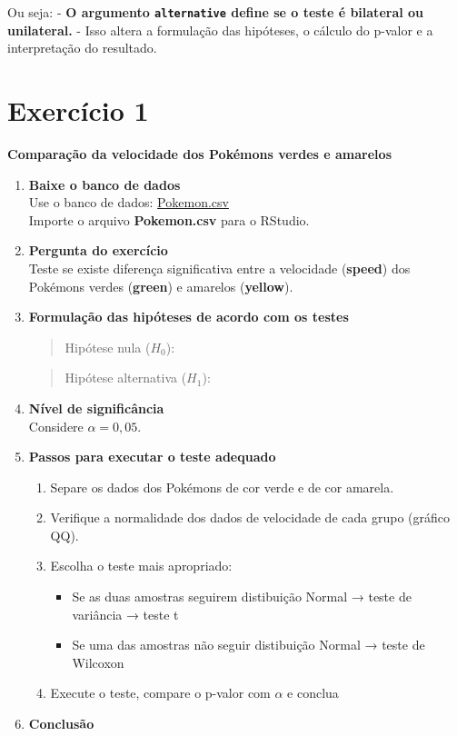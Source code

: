 \documentclass[
]{book}
\providecommand{\tightlist}{%
  \setlength{\itemsep}{0pt}\setlength{\parskip}{0pt}}
\begin{document}
Ou seja:
- \textbf{O argumento \texttt{alternative} define se o teste é bilateral ou unilateral.}
- Isso altera a formulação das hipóteses, o cálculo do p-valor e a interpretação do resultado.

\section{Exercício 1}\label{exercuxedcio-1}

\textbf{Comparação da velocidade dos Pokémons verdes e amarelos}

\begin{enumerate}
\def\labelenumi{\arabic{enumi}.}
\item
  \textbf{Baixe o banco de dados}\\
  Use o banco de dados: \href{https://drive.google.com/drive/folders/1gyORbBEuKBstfSKULA58TLhawOXaY-st}{Pokemon.csv}\\
  Importe o arquivo \textbf{Pokemon.csv} para o RStudio.
\item
  \textbf{Pergunta do exercício}\\
  Teste se existe diferença significativa entre a velocidade (\textbf{speed}) dos Pokémons verdes (\textbf{green}) e amarelos (\textbf{yellow}).
\item
  \textbf{Formulação das hipóteses de acordo com os testes}

  \begin{quote}
  Hipótese nula (\(H_0\)):
  \end{quote}

  \begin{quote}
  Hipótese alternativa (\(H_1\)):
  \end{quote}
\item
  \textbf{Nível de significância}\\
  Considere \(\alpha = 0,05\).
\item
  \textbf{Passos para executar o teste adequado}

  \begin{enumerate}
  \def\labelenumii{\alph{enumii})}
  \tightlist
  \item
    Separe os dados dos Pokémons de cor verde e de cor amarela.\\
  \item
    Verifique a normalidade dos dados de velocidade de cada grupo (gráfico QQ).\\
  \item
    Escolha o teste mais apropriado:

    \begin{itemize}
    \tightlist
    \item
      Se as duas amostras seguirem distibuição Normal → teste de variância → teste t
    \item
      Se uma das amostras não seguir distibuição Normal → teste de Wilcoxon
    \end{itemize}
  \item
    Execute o teste, compare o p-valor com \(\alpha\) e conclua
  \end{enumerate}
\item
  \textbf{Conclusão}


\end{enumerate}
\end{document}
